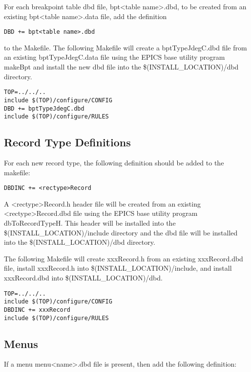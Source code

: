For each breakpoint table dbd file, bpt\textless{}table name\textgreater{}.dbd, to be created from an existing bpt\textless{}table name\textgreater{}.data file, add the 
definition

\begin{verbatim}DBD += bpt<table name>.dbd
\end{verbatim}to the Makefile. The following Makefile will create a bptTypeJdegC.dbd file from an existing bptTypeJdegC.data file 
using the EPICS base utility program makeBpt and install the new dbd file into the \$(INSTALL\_LOCATION)/dbd 
directory.

\begin{verbatim}TOP=../../..
include $(TOP)/configure/CONFIG
DBD += bptTypeJdegC.dbd
include $(TOP)/configure/RULES
\end{verbatim}\subsection{Record Type Definitions}

For each new record type, the following definition should be added to the makefile:

\begin{verbatim}DBDINC += <rectype>Record
\end{verbatim}A \textless{}rectype\textgreater{}Record.h header file will be created from an existing \textless{}rectype\textgreater{}Record.dbd file using the EPICS base utility 
program dbToRecordTypeH. This header will be installed into the \$(INSTALL\_LOCATION)/include directory and the 
dbd file will be installed into the \$(INSTALL\_LOCATION)/dbd directory.

The following Makefile will create xxxRecord.h from an existing xxxRecord.dbd file, install xxxRecord.h into 
\$(INSTALL\_LOCATION)/include, and install xxxRecord.dbd into \$(INSTALL\_LOCATION)/dbd.

\begin{verbatim}TOP=../../..
include $(TOP)/configure/CONFIG
DBDINC += xxxRecord
include $(TOP)/configure/RULES
\end{verbatim}\subsection{Menus}

If a menu menu\textless{}name\textgreater{}.dbd file is present, then add the following definition:

